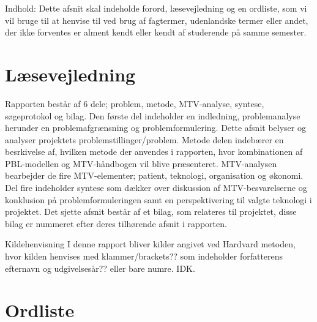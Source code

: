 Indhold: Dette afsnit skal indeholde forord, 
læsevejledning og en ordliste, som vi vil bruge til at henvise til ved brug af fagtermer, udenlandske termer eller andet, der ikke forventes er alment kendt eller kendt af studerende på samme semester. 




\section{Læsevejledning}
Rapporten består af 6 dele; problem, metode, MTV-analyse, syntese, søgeprotokol og bilag. Den første del indeholder en indledning, problemanalyse herunder en problemafgrænsning og problemformulering. Dette afsnit belyser og analyser projektets problemstillinger/problem.
Metode delen indebærer en besrkivelse af, hvilken metode der anvendes i rapporten, hvor kombinationen af PBL-modellen og MTV-håndbogen vil blive præsenteret. MTV-analysen bearbejder de fire MTV-elementer; patient, teknologi, organisation og økonomi. Del fire indeholder syntese som dækker over diskussion af MTV-besvarelserne og konklusion på problemformuleringen samt en perspektivering til valgte teknologi i projektet. Det sjette afsnit består af et bilag, som relateres til projektet, disse bilag er nummeret efter deres tilhørende afsnit i rapporten.  


Kildehenvisning
I denne rapport bliver kilder angivet ved Hardvard metoden, hvor kilden henvises med klammer/brackets?? som indeholder forfatterens efternavn og udgivelsesår?? eller bare numre. IDK.


\section{Ordliste}